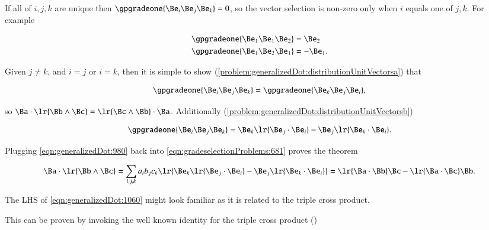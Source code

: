 If all of \( i, j, k \) are unique then \( \gpgradeone{ \Be_i \Be_j \Be_k } = 0 \), so the vector selection is non-zero only when \( i \) equals one of \( j, k \).  For example

\begin{dmath}\label{eqn:generalizedDot:1040}
\begin{aligned}
\gpgradeone{ \Be_1 \Be_1 \Be_2 } &= \Be_2 \\
\gpgradeone{ \Be_1 \Be_2 \Be_1 } &= -\Be_1.
\end{aligned}
\end{dmath}

Given \( j \ne k \), and \( i = j \) or \( i = k \),  then it is simple to show
(\cref{problem:generalizedDot:distributionUnitVectorsa})
that

\begin{equation}\label{eqn:generalizedDot:1020}
\gpgradeone{ \Be_i \Be_j \Be_k }
= \gpgradeone{ \Be_k \Be_j \Be_i },
\end{equation}

so \( \Ba \cdot \lr{ \Bb \wedge \Bc } = \lr{ \Bc \wedge \Bb } \cdot \Ba \).  Additionally
(\cref{problem:generalizedDot:distributionUnitVectorsb})

\begin{equation}\label{eqn:generalizedDot:980}
\gpgradeone{ \Be_i \Be_j \Be_k }
=
\Be_k \lr{ \Be_j \cdot \Be_i }
-\Be_j \lr{ \Be_k \cdot \Be_i }.
\end{equation}

Plugging \cref{eqn:generalizedDot:980} back into \cref{eqn:gradeselectionProblems:681} proves the theorem

\begin{dmath}\label{eqn:generalizedDot:1060}
\Ba \cdot \lr{ \Bb \wedge \Bc }
= \sum_{i, j, k} a_i b_j c_k \lr{ \Be_k \lr{ \Be_j \cdot \Be_i }
-\Be_j \lr{ \Be_k \cdot \Be_i } }
=
\lr{ \Ba \cdot \Bb } \Bc
- \lr{ \Ba \cdot \Bc } \Bb.
\end{dmath}

The LHS of \cref{eqn:generalizedDot:1060} might look familiar as it is related to the  triple cross product.

This can be proven by invoking the well known
identity for the triple cross product
(\citep{jackson1975cew})

